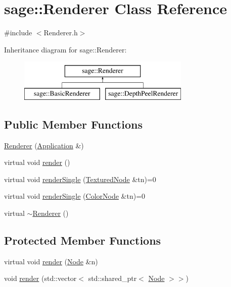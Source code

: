 \hypertarget{classsage_1_1Renderer}{}\section{sage\+::Renderer Class Reference}
\label{classsage_1_1Renderer}


{\ttfamily \#include $<$Renderer.\+h$>$}

Inheritance diagram for sage\+::Renderer\+:\begin{figure}[H]
\begin{center}
\leavevmode
\includegraphics[height=2.000000cm]{classsage_1_1Renderer}
\end{center}
\end{figure}
\subsection*{Public Member Functions}
\begin{DoxyCompactItemize}
\item 
\mbox{\hyperlink{classsage_1_1Renderer_aea1ceb080017504798f28cde4d45502e}{Renderer}} (\mbox{\hyperlink{classsage_1_1Application}{Application}} \&)
\item 
virtual void \mbox{\hyperlink{classsage_1_1Renderer_af7e5f8f68742f198e315fb4683a605a4}{render}} ()
\item 
virtual void \mbox{\hyperlink{classsage_1_1Renderer_aa79cfd587fa85ae8ea7ccf465825d212}{render\+Single}} (\mbox{\hyperlink{classsage_1_1TexturedNode}{Textured\+Node}} \&tn)=0
\item 
virtual void \mbox{\hyperlink{classsage_1_1Renderer_a8f0af306879420d208abd8a0555055b5}{render\+Single}} (\mbox{\hyperlink{classsage_1_1ColorNode}{Color\+Node}} \&tn)=0
\item 
virtual \mbox{\hyperlink{classsage_1_1Renderer_afeee408862d5bd6255a6882d47e6d5cd}{$\sim$\+Renderer}} ()
\end{DoxyCompactItemize}
\subsection*{Protected Member Functions}
\begin{DoxyCompactItemize}
\item 
virtual void \mbox{\hyperlink{classsage_1_1Renderer_a213548aab22256923579dcfda01b12ba}{render}} (\mbox{\hyperlink{classsage_1_1Node}{Node}} \&n)
\item 
void \mbox{\hyperlink{classsage_1_1Renderer_a26b3671c3df207eaf2620fdc06a2610e}{render}} (std\+::vector$<$ std\+::shared\+\_\+ptr$<$ \mbox{\hyperlink{classsage_1_1Node}{Node}} $>$$>$)
\end{DoxyCompactItemize}
